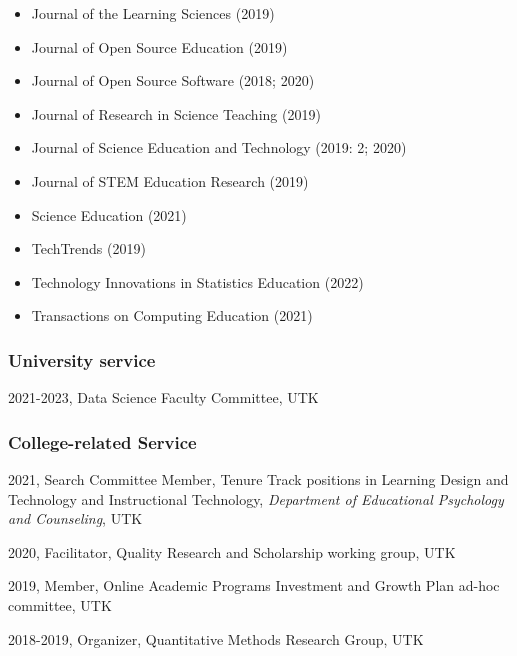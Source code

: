 \documentclass[
  14,
]{article}
\begin{document}
\begin{itemize}
\item
  Journal of the Learning Sciences (2019)\\
\item
  Journal of Open Source Education (2019)\\
\item
  Journal of Open Source Software (2018; 2020)\\
\item
  Journal of Research in Science Teaching (2019)\\
\item
  Journal of Science Education and Technology (2019: 2; 2020)\\
\item
  Journal of STEM Education Research (2019)\\
\item
  Science Education (2021)\\
\item
  TechTrends (2019)\\
\item
  Technology Innovations in Statistics Education (2022)\\
\item
  Transactions on Computing Education (2021)
\end{itemize}

\hypertarget{university-service}{%
\subsubsection{University service}\label{university-service}}

2021-2023, Data Science Faculty Committee, UTK

\hypertarget{college-related-service}{%
\subsubsection{College-related Service}\label{college-related-service}}

2021, Search Committee Member, Tenure Track positions in Learning Design
and Technology and Instructional Technology, \emph{Department of
Educational Psychology and Counseling}, UTK

2020, Facilitator, Quality Research and Scholarship working group, UTK

2019, Member, Online Academic Programs Investment and Growth Plan ad-hoc
committee, UTK

2018-2019, Organizer, Quantitative Methods Research Group, UTK
\end{document}
